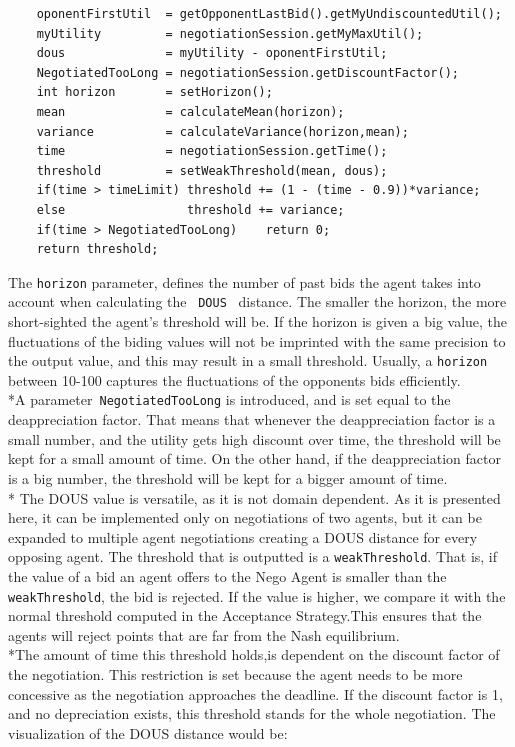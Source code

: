 \documentclass[html]{report}    %
\begin{document}
\begin{verbatim}
	oponentFirstUtil  = getOpponentLastBid().getMyUndiscountedUtil();
	myUtility         = negotiationSession.getMyMaxUtil();
	dous              = myUtility - oponentFirstUtil; 
	NegotiatedTooLong = negotiationSession.getDiscountFactor();
	int horizon       = setHorizon();
	mean              = calculateMean(horizon);
	variance          = calculateVariance(horizon,mean);
	time              = negotiationSession.getTime();
	threshold         = setWeakThreshold(mean, dous);
	if(time > timeLimit) threshold += (1 - (time - 0.9))*variance;
	else                 threshold += variance;
	if(time > NegotiatedTooLong)    return 0;
	return threshold;
\end{verbatim}

The \texttt{horizon} parameter, defines the number of past bids the agent takes into account when calculating the ~\texttt{DOUS}~\cite{anac2013} distance. The smaller the horizon, the more short-sighted the agent's threshold will be. If the horizon is given a big value, the fluctuations of the biding values will not be imprinted with the same precision to the output value, and this may result in a small threshold. Usually, a \texttt{horizon} between 10-100 captures the fluctuations of the opponents bids efficiently.
 \\*A parameter~\texttt{NegotiatedTooLong} is introduced, and is set equal to the deappreciation factor. That means that whenever the deappreciation factor is a small number, and the utility gets high discount over time, the threshold will be kept for a small amount of time. On the other hand, if the deappreciation factor is a big number, the threshold will be kept for a bigger amount of time.
\\* The DOUS value is versatile, as it is not domain dependent.
As it is presented here, it can be implemented only on negotiations of two agents, but it can be expanded to multiple agent negotiations creating a DOUS distance for every opposing agent. The threshold that is outputted is a \texttt{weakThreshold}. That is, if the value of a bid an agent offers to the Nego Agent is smaller than the \texttt{weakThreshold}, the bid is rejected. If the value is higher, we compare it with the normal threshold computed in the Acceptance Strategy.This ensures that the agents will reject points that are far from the Nash equilibrium.
\\*The amount of time this threshold holds,is dependent on the discount factor of the negotiation. This restriction is set because the agent needs to be more concessive as the negotiation approaches the deadline. If the discount factor is 1, and no depreciation exists, this threshold stands for the whole negotiation. 
The visualization of the DOUS distance would be:
\end{document}
